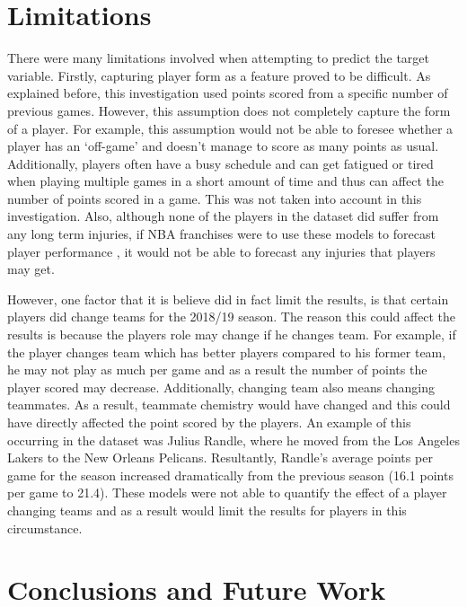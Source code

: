 \documentclass[a4paper,11pt,twoside]{article}
\begin{document}
\clearpage

\section{Limitations}
\vspace{6mm}

There were many limitations involved when attempting to predict the target variable. Firstly, capturing player form as a feature proved to be difficult. As explained before, this investigation used points scored from a specific number of previous games. However, this assumption does not completely capture the form of a player. For example, this assumption would not be able to foresee whether a player has an `off-game' and doesn't manage to score as many points as usual. Additionally, players often have a busy schedule and can get fatigued or tired when playing multiple games in a short amount of time and thus can affect the number of points scored in a game. This was not taken into account in this investigation. Also, although none of the players in the dataset did suffer from any long term injuries, if NBA franchises were to use these models to forecast player performance , it would not be able to forecast any injuries that players may get. 

However, one factor that it is believe did in fact limit the results, is that certain players did change teams for the 2018/19 season. The reason this could affect the results is because the players role may change if he changes team. For example, if the player changes team which has better players compared to his former team, he may not play as much per game and as a result the number of points the player scored may decrease. Additionally, changing team also means changing teammates. As a result, teammate chemistry would have changed and this could have directly affected the point scored by the players. An example of this occurring in the dataset was Julius Randle, where he moved from the Los Angeles Lakers to the New Orleans Pelicans. Resultantly, Randle's average points per game for the season increased dramatically from the previous season (16.1 points per game to 21.4). These models were not able to quantify the effect of a player changing teams and as a result would limit the results for players in this circumstance.


\newpage
\section{Conclusions and Future Work}
\vspace{6mm}
\end{document}
